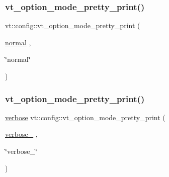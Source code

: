 \mbox{\label{namespacevt_1_1config_a2a62a5b19196c78acd0a1ae882296057}} 
\subsubsection{\texorpdfstring{vt\+\_\+option\+\_\+mode\+\_\+pretty\+\_\+print()}{vt\_option\_mode\_pretty\_print()}\hspace{0.1cm}{\footnotesize\ttfamily [1/4]}}
{\footnotesize\ttfamily vt\+::config\+::vt\+\_\+option\+\_\+mode\+\_\+pretty\+\_\+print (\begin{DoxyParamCaption}\item[{\hyperlink{namespacevt_1_1config_a724e99568632cc0fe9c456c2230270d0a6865573ccc58716514eb9a164a52c256}{normal}}]{,  }\item[{\char`\"{}normal\char`\"{}}]{ }\end{DoxyParamCaption})}

\mbox{\label{namespacevt_1_1config_ac9a6c3e32f51bde08f2a5ae626c92087}} 
\subsubsection{\texorpdfstring{vt\+\_\+option\+\_\+mode\+\_\+pretty\+\_\+print()}{vt\_option\_mode\_pretty\_print()}\hspace{0.1cm}{\footnotesize\ttfamily [2/4]}}
{\footnotesize\ttfamily \hyperlink{namespacevt_1_1config_a724e99568632cc0fe9c456c2230270d0a9b54bf70f7b7fe7cfb6f3da0e167ae27}{verbose} vt\+::config\+::vt\+\_\+option\+\_\+mode\+\_\+pretty\+\_\+print (\begin{DoxyParamCaption}\item[{\hyperlink{namespacevt_1_1config_a724e99568632cc0fe9c456c2230270d0a01e37c0a9cbc45367fe4a8452e1c29a2}{verbose\+\_\+2}}]{,  }\item[{\char`\"{}verbose\+\_\+2\char`\"{}}]{ }\end{DoxyParamCaption})}

